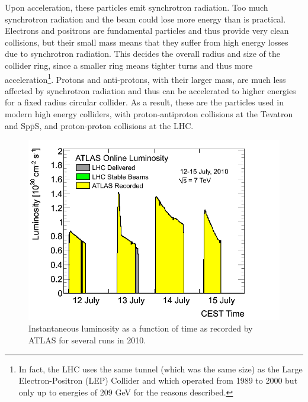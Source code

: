 Upon acceleration, these particles emit synchrotron radiation.
Too much synchrotron radiation and the beam could lose more energy
than is practical. 
Electrons and positrons are fundamental particles and thus provide
very clean collisions, but their small mass means that they suffer
from high energy losses due to synchrotron radiation.
This decides the overall radius and size of the collider ring, since a smaller
ring means tighter turns and thus more acceleration\footnote{In fact, 
the LHC uses the same tunnel (which was the same size) as 
the Large Electron-Positron (LEP) Collider and which
operated from 1989 to 2000 but only up to energies of 209 GeV for the reasons
described.}.
Protons and anti-protons, with their larger mass, 
are much less affected by synchrotron radiation
and thus can be accelerated to higher energies for a fixed radius 
circular collider. As a result, these are the particles used
in modern high energy colliders, with proton-antiproton collisions
at the Tevatron and Sp$\overline{\textrm{p}}$S, and proton-proton
collisions at the LHC.


\begin{figure}[ht]
\centering
\includegraphics[width=.7\textwidth]{figures/lhc/instantaneouslumi.png}
\caption{Instantaneous luminosity as a function of time
as recorded by ATLAS for several runs in 2010.}
\label{fig:lhc_inst_lumi}
\end{figure}

